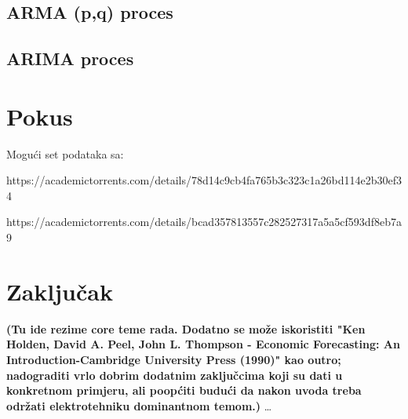 \documentclass[a4paper,12pt,oneside]{memoir}
\begin{document}
        \section{ARMA (p,q) proces}
        \section{ARIMA proces}
    \chapter{Pokus}
        Mogući set podataka sa:

        https://academictorrents.com/details/78d14c9cb4fa765b3c323c1a26bd114e2b30ef34

        https://academictorrents.com/details/bcad357813557c282527317a5a5cf593df8eb7a9
    \chapter{Zaključak}
        \textbf{(Tu ide rezime core teme rada. Dodatno se može iskoristiti "Ken Holden, David A. Peel, John L. Thompson - Economic Forecasting: An Introduction-Cambridge University Press (1990)" kao outro; nadograditi vrlo dobrim dodatnim zaključcima koji su dati u konkretnom primjeru, ali poopćiti budući da nakon uvoda treba održati elektrotehniku dominantnom temom.)} %
        \ldots{}
\end{document}
